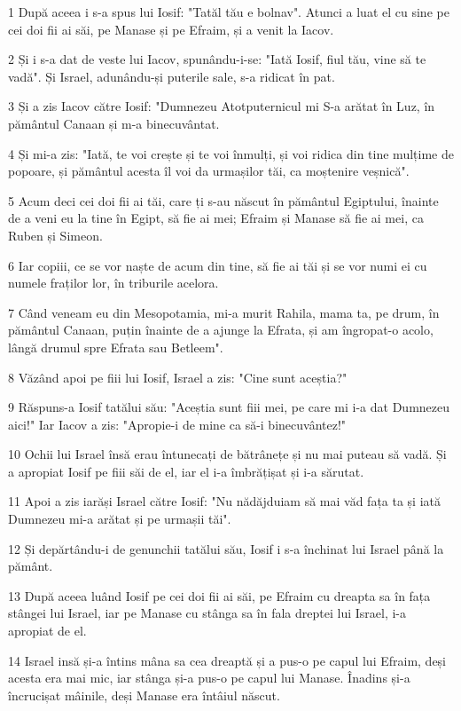 \par 1 După aceea i s-a spus lui Iosif: "Tatăl tău e bolnav". Atunci a luat el cu sine pe cei doi fii ai săi, pe Manase și pe Efraim, și a venit la Iacov.
\par 2 Și i s-a dat de veste lui Iacov, spunându-i-se: "Iată Iosif, fiul tău, vine să te vadă". Și Israel, adunându-și puterile sale, s-a ridicat în pat.
\par 3 Și a zis Iacov către Iosif: "Dumnezeu Atotputernicul mi S-a arătat în Luz, în pământul Canaan și m-a binecuvântat.
\par 4 Și mi-a zis: "Iată, te voi crește și te voi înmulți, și voi ridica din tine mulțime de popoare, și pământul acesta îl voi da urmașilor tăi, ca moștenire veșnică".
\par 5 Acum deci cei doi fii ai tăi, care ți s-au născut în pământul Egiptului, înainte de a veni eu la tine în Egipt, să fie ai mei; Efraim și Manase să fie ai mei, ca Ruben și Simeon.
\par 6 Iar copiii, ce se vor naște de acum din tine, să fie ai tăi și se vor numi ei cu numele fraților lor, în triburile acelora.
\par 7 Când veneam eu din Mesopotamia, mi-a murit Rahila, mama ta, pe drum, în pământul Canaan, puțin înainte de a ajunge la Efrata, și am îngropat-o acolo, lângă drumul spre Efrata sau Betleem".
\par 8 Văzând apoi pe fiii lui Iosif, Israel a zis: "Cine sunt aceștia?"
\par 9 Răspuns-a Iosif tatălui său: "Aceștia sunt fiii mei, pe care mi i-a dat Dumnezeu aici!" Iar Iacov a zis: "Apropie-i de mine ca să-i binecuvântez!"
\par 10 Ochii lui Israel însă erau întunecați de bătrânețe și nu mai puteau să vadă. Și a apropiat Iosif pe fiii săi de el, iar el i-a îmbrățișat și i-a sărutat.
\par 11 Apoi a zis iarăși Israel către Iosif: "Nu nădăjduiam să mai văd fața ta și iată Dumnezeu mi-a arătat și pe urmașii tăi".
\par 12 Și depărtându-i de genunchii tatălui său, Iosif i s-a închinat lui Israel până la pământ.
\par 13 După aceea luând Iosif pe cei doi fii ai săi, pe Efraim cu dreapta sa în fața stângei lui Israel, iar pe Manase cu stânga sa în fala dreptei lui Israel, i-a apropiat de el.
\par 14 Israel insă și-a întins mâna sa cea dreaptă și a pus-o pe capul lui Efraim, deși acesta era mai mic, iar stânga și-a pus-o pe capul lui Manase. Înadins și-a încrucișat mâinile, deși Manase era întâiul născut.
